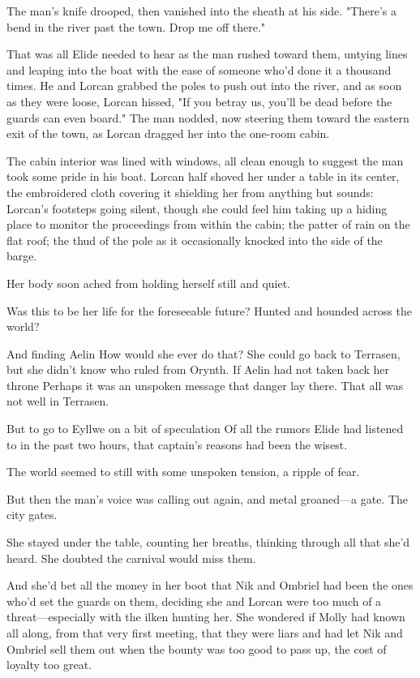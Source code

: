 The man's knife drooped, then vanished into the sheath at his side. "There's a bend in the river past the town. Drop me off there."

That was all Elide needed to hear as the man rushed toward them, untying lines and leaping into the boat with the ease of someone who'd done it a thousand times. He and Lorcan grabbed the poles to push out into the river, and as soon as they were loose, Lorcan hissed, "If you betray us, you'll be dead before the guards can even board." The man nodded, now steering them toward the eastern exit of the town, as Lorcan dragged her into the one-room cabin.

The cabin interior was lined with windows, all clean enough to suggest the man took some pride in his boat. Lorcan half shoved her under a table in its center, the embroidered cloth covering it shielding her from anything but sounds: Lorcan's footsteps going silent, though she could feel him taking up a hiding place to monitor the proceedings from within the cabin; the patter of rain on the flat roof; the thud of the pole as it occasionally knocked into the side of the barge.

Her body soon ached from holding herself still and quiet.

Was this to be her life for the foreseeable future? Hunted and hounded across the world?

And finding Aelin  How would she ever do that? She could go back to Terrasen, but she didn't know who ruled from Orynth. If Aelin had not taken back her throne  Perhaps it was an unspoken message that danger lay there. That all was not well in Terrasen.

But to go to Eyllwe on a bit of speculation  Of all the rumors Elide had listened to in the past two hours, that captain's reasons had been the wisest.

The world seemed to still with some unspoken tension, a ripple of fear.

But then the man's voice was calling out again, and metal groaned---a gate. The city gates.

She stayed under the table, counting her breaths, thinking through all that she'd heard. She doubted the carnival would miss them.

And she'd bet all the money in her boot that Nik and Ombriel had been the ones who'd set the guards on them, deciding she and Lorcan were too much of a threat---especially with the ilken hunting her. She wondered if Molly had known all along, from that very first meeting, that they were liars and had let Nik and Ombriel sell them out when the bounty was too good to pass up, the cost of loyalty too great.

